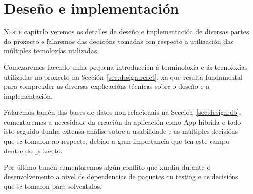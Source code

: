 \chapter{Deseño e implementación}
\minitoc


  \lettrine{N}{este} capítulo veremos os detalles de deseño e implementación 
de diversas partes do proxecto e falaremos das decisións tomadas con 
respecto a utilización das múltiples tecnoloxías utilizadas.

  Comezaremos facendo unha pequena introducción á terminoloxía e ás tecnoloxías 
utilizadas no proxecto na Sección~\ref{sec:design:react}, xa que resulta 
fundamental para comprender as diversas explicacións técnicas sobre o deseño e 
a implementación.

  Falaremos tamén das bases de datos non relacionais na 
Sección~\ref{sec:design:db}, comentaremos a necesidade da creación da 
aplicación como App híbrida e todo isto seguido dunha extensa análise sobre a 
usabilidade e as múltiples decisións que se tomaron ao respecto, debido a gran 
importancia que ten este campo dentro do proxecto.

  Por último tamén comentaremos algún conflito que xurdíu durante o 
desenvolvemento a nivel de dependencias de paquetes ou testing e as decisións 
que se tomaron para solventalos.

